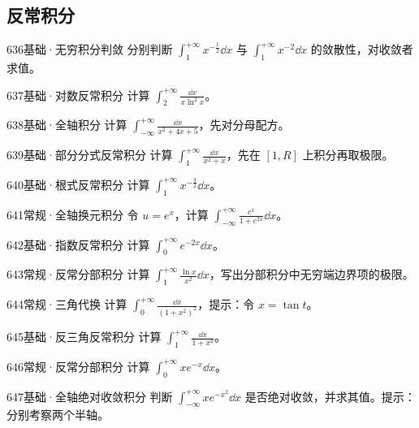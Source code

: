 \subsection{反常积分}
\begin{exercise}{636}{基础·无穷积分判敛}
分别判断 $\int_1^{+\infty}x^{-\frac{1}{2}}\dd x$ 与 $\int_1^{+\infty}x^{-2}\dd x$ 的敛散性，对收敛者求值。
\end{exercise}
\begin{exercise}{637}{基础·对数反常积分}
计算 $\int_2^{+\infty}\frac{\dd x}{x\ln^2x}$。
\end{exercise}
\begin{exercise}{638}{基础·全轴积分}
计算 $\int_{-\infty}^{+\infty}\frac{\dd x}{x^2+4x+5}$，先对分母配方。
\end{exercise}
\begin{exercise}{639}{基础·部分分式反常积分}
计算 $\int_1^{+\infty}\frac{\dd x}{x^2+x}$，先在 $[1,R]$ 上积分再取极限。
\end{exercise}
\begin{exercise}{640}{基础·根式反常积分}
计算 $\int_1^{+\infty}x^{-\frac{3}{2}}\dd x$。
\end{exercise}
\begin{exercise}{641}{常规·全轴换元积分}
令 $u=e^x$，计算 $\int_{-\infty}^{+\infty}\frac{e^x}{1+e^{2x}}\dd x$。
\end{exercise}
\begin{exercise}{642}{基础·指数反常积分}
计算 $\int_0^{+\infty}e^{-2x}\dd x$。
\end{exercise}
\begin{exercise}{643}{常规·反常分部积分}
计算 $\int_1^{+\infty}\frac{\ln x}{x^2}\dd x$，写出分部积分中无穷端边界项的极限。
\end{exercise}
\begin{exercise}{644}{常规·三角代换}
计算 $\int_0^{+\infty}\frac{\dd x}{(1+x^2)^2}$，提示：令 $x=\tan t$。
\end{exercise}
\begin{exercise}{645}{基础·反三角反常积分}
计算 $\int_1^{+\infty}\frac{\dd x}{1+x^2}$。
\end{exercise}
\begin{exercise}{646}{常规·反常分部积分}
计算 $\int_0^{+\infty}xe^{-x}\dd x$。
\end{exercise}
\begin{exercise}{647}{基础·全轴绝对收敛积分}
判断 $\int_{-\infty}^{+\infty}xe^{-x^2}\dd x$ 是否绝对收敛，并求其值。提示：分别考察两个半轴。
\end{exercise}
